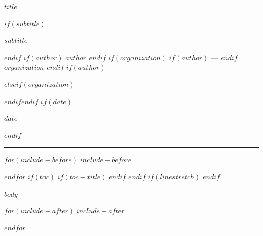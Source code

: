 \documentclass[11pt,a4paper]{scrartcl}
\newcommand{\makeinlinetitle}{
  \vspace*{1cm}
  {\Huge\bfseries $title$\par}
  $if(subtitle)$
  \vspace{0.3cm}
  {\Large\color{textgray} $subtitle$\par}
  $endif$
  \vspace{0.3cm}
  $if(author)$
  {\normalsize $author$}%
  $endif$
  $if(organization)$
  $if(author)$ — $endif${\normalsize $organization$}%
  $endif$
  $if(author)$\par$else$$if(organization)$\par$endif$$endif$
  $if(date)$
  {\small\textcolor{textgray}{$date$}\par}
  $endif$
  \vspace{0.5cm}
  \rule{\textwidth}{0.4pt}
  \vspace{0.5cm}
}
\begin{document}
\makeinlinetitle

$for(include-before)$
$include-before$

$endfor$
$if(toc)$
$if(toc-title)$
\renewcommand*\contentsname{$toc-title$}
$endif$
{
\setcounter{tocdepth}{$if(toc-depth)$$toc-depth$$else$3$endif$}
\tableofcontents
}
\vspace{1cm}
$endif$
$if(linestretch)$
$endif$

$body$

$for(include-after)$
$include-after$

$endfor$
\end{document}
